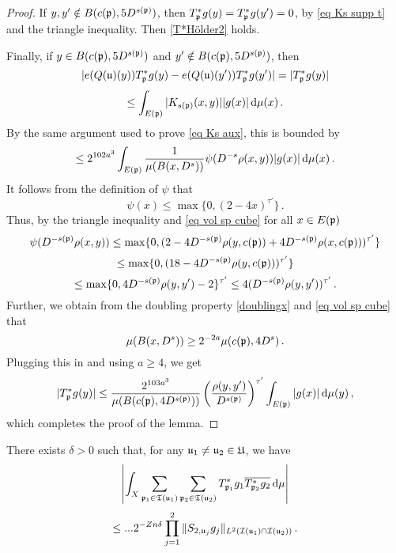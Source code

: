 \begin{proof}
    If $y,y' \notin B(c(\mathfrak p), 5D^{s(\mathfrak p)})$, then $T_{\mathfrak p}^*g(y) = T_{\mathfrak p}^*g(y') = 0$, by \eqref{eq Ks supp t} and the triangle inequality. Then \eqref{T*Hölder2} holds.

    Finally, if $y \in B(c(\mathfrak p), 5D^{s(\mathfrak p)})$ and $y' \notin B(c(\mathfrak p), 5D^{s(\mathfrak p)})$, then
    $$
        |e(Q(\mathfrak u)(y)) T_{\mathfrak p}^* g(y) - e(Q(\mathfrak u)(y')) T_{\mathfrak p}^* g(y')| = |T_{\mathfrak p}^* g(y)|
    $$
    $$
        \le \int_{E(\mathfrak p)} |K_{s(\mathfrak p)}(x,y)| |g(x)| \, \mathrm{d}\mu(x)\,.
    $$
    By the same argument used to prove \eqref{eq Ks aux}, this is bounded by
    $$
        \le 2^{102a^3} \int_{E(\mathfrak p)} \frac{1}{\mu(B(x, D^s))} \psi(D^{-s} \rho(x,y)) |g(x)| \, \mathrm{d}\mu(x)\,.
    $$
    It follows from the definition of $\psi$ that
    $$
        \psi(x) \le \max\{0, (2  - 4x)^{\tau'}\}\,.
    $$
    Thus, by the triangle inequality and \eqref{eq vol sp cube} for all $x\in E(\mathfrak p)$
    $$
        \psi(D^{-s(\mathfrak p)}\rho(x,y)) \le \max\{0, (2  - 4D^{-s(\mathfrak p)}\rho(y, c(\mathfrak p)) + 4 D^{-s(\mathfrak p)}\rho(x, c(\mathfrak p)))^{\tau'}\}
    $$
    $$
        \le \max\{0, (18 - 4 D^{-s(\mathfrak p)} \rho(y, c(\mathfrak p)))^{\tau'}\}
    $$
    $$
        \le \max\{0, 4 D^{-s(\mathfrak p)}\rho(y,y') - 2\}^{\tau'} \le 4 (D^{-s(\mathfrak p)}\rho(y,y'))^{\tau'}\,.
    $$
    Further, we obtain from the doubling property \eqref{doublingx} and \eqref{eq vol sp cube} that
    $$
        \mu(B(x, D^s)) \ge 2^{-2a} \mu(c(\mathfrak p), 4D^s)\,.
    $$
    Plugging this in and using $a \ge 4$, we get
    $$
        |T_{\mathfrak p}^* g(y)| \le   \frac{2^{103a^3}}{\mu(B(c(\mathfrak p), 4D^{s(\mathfrak p)}))} \left(\frac{\rho(y,y')}{D^{s(\mathfrak p)}}\right)^{\tau'} \int_{E(\mathfrak p)} |g(x)| \, \mathrm{d}\mu(y)\,,
    $$
    which completes the proof of the lemma.
\end{proof}


\begin{lemma}
    \label{SeparatedTrees}
    There exists $\delta > 0$  such that, for any $\mathfrak u_1 \ne \mathfrak u_2 \in \mathfrak U$, we have
    \begin{equation}
        \label{eq lhs sep tree}
        \left| \int_X \sum_{\mathfrak p_1 \in \mathfrak T(\mathfrak u_1)} \sum_{\mathfrak p_2 \in \mathfrak T(\mathfrak u_2)} T^*_{\mathfrak p_1}g_1 \overline{T^*_{\mathfrak p_2}g_2 }\,\mathrm{d}\mu \right|
    \end{equation}
    \begin{equation}
        \label{eq rhs sep tree}
        \le ... 2^{-Zn\delta} \prod_{j =1}^2 \| S_{2, \mathfrak u_j} g_j\|_{L^2(\mathcal{I}(\mathfrak u_1) \cap \mathcal{I}(\mathfrak u_2))}\,.
    \end{equation}
\end{lemma}

